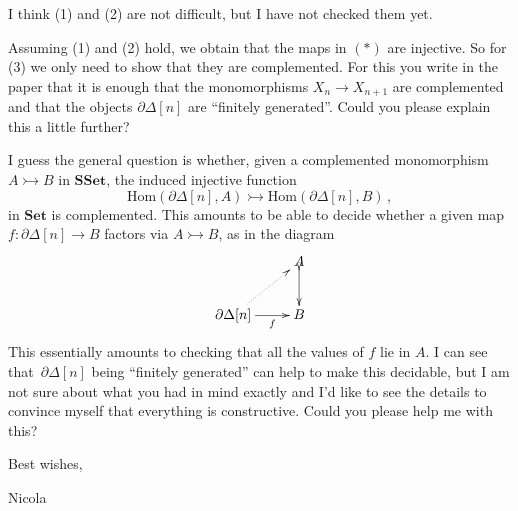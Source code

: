 \documentclass[11pt, oneside]{article}   	%
\newcommand{\co}{\colon}
\newcommand{\SSet}{\mathbf{SSet}}
\newcommand{\Set}{\mathbf{Set}}
\newcommand{\boundary}{\partial}
\begin{document}
I think (1) and (2) are not difficult, but I have not checked them yet.

Assuming (1) and (2) hold, we obtain that the maps in  $(\ast)$ are injective. So for (3) we only 
need to show that they
are complemented. For this you write in the paper that it is enough that 
the monomorphisms $X_n \to X_{n+1}$ are complemented and that the objects $\partial \Delta[n]$ are 
``finitely generated''.  Could you please explain this a little further? 

I guess the general question is whether, given a complemented monomorphism $A \rightarrowtail B$
in $\SSet$, the induced injective function 
\[
\mathrm{Hom}( \boundary \Delta[n], A) \rightarrowtail \mathrm{Hom}(\boundary \Delta[n], B) \, , 
\]
in $\Set$ is complemented. This amounts to be able to decide whether a given map~$f \co \partial \Delta[n]
\to B$ factors via $A \rightarrowtail B$, as in the diagram
\[
\xymatrix{
& A \ar@{>->}[d]\\
\partial \Delta[n]  \ar[r]_-f \ar@{.>}[ur] & B }
\]
This essentially amounts to checking that all the values of $f$ lie in $A$. I can see that~$\partial \Delta[n]$ being ``finitely generated'' can help to make this decidable, but I am not sure about what you had in
mind exactly and I'd like to see the details to convince myself that everything is constructive. Could you please help me with this? 


\bigskip

Best wishes,

Nicola
\end{document}
